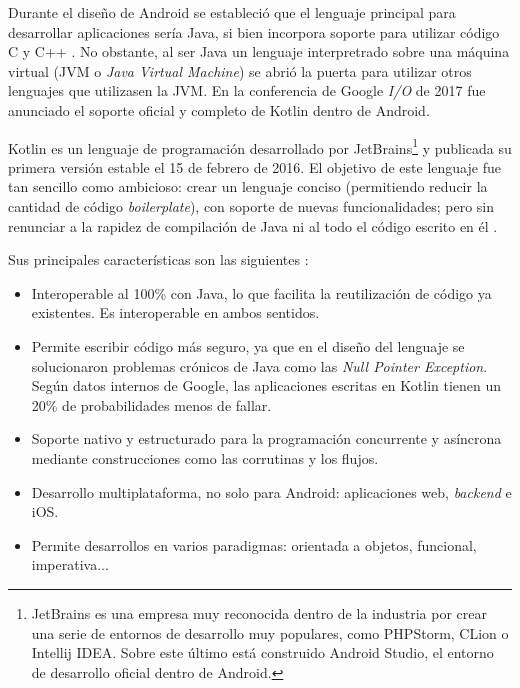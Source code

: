             Durante el diseño de Android se estableció que el lenguaje principal para desarrollar aplicaciones sería 
            Java, si bien incorpora soporte para utilizar código C y C++ \cite{android_developers_como_nodate}. No
            obstante, al ser Java un lenguaje interpretrado sobre una máquina virtual (JVM o \textit{Java Virtual
            Machine}) se abrió la puerta para  utilizar otros lenguajes que utilizasen la JVM. En la conferencia de 
            Google \textit{I/O} de 2017 fue anunciado el soporte oficial y completo 
            de Kotlin dentro de Android. 

            Kotlin es un lenguaje de programación desarrollado por JetBrains\footnote{JetBrains es una
            empresa muy reconocida dentro de la industria por crear una serie de entornos de desarrollo muy populares,
            como PHPStorm, CLion o Intellij IDEA. Sobre este último está construido Android Studio, el entorno de 
            desarrollo oficial dentro de Android.} y publicada su primera versión estable el 15 de febrero de 2016.
            El objetivo de este lenguaje fue tan sencillo como ambicioso: crear un lenguaje conciso (permitiendo reducir
            la cantidad de código \textit{boilerplate}), con soporte de nuevas funcionalidades; pero sin renunciar a la rapidez de
            compilación de Java ni al todo el código escrito en él 
            \cite{rao_k_history_nodate}. 

            Sus principales características son las siguientes \cite{noauthor_kotlin_nodate} \cite{noauthor_enfoque_nodate}:
            \begin{itemize}
                \item Interoperable al 100\% con Java, lo que facilita la reutilización de código ya existentes. 
                Es interoperable en ambos sentidos.
                \item Permite escribir código más seguro, ya que en el diseño del lenguaje se solucionaron problemas
                crónicos de Java como las \textit{Null Pointer Exception}. Según datos internos de Google, las 
                aplicaciones escritas en Kotlin tienen un 20\% de probabilidades menos de fallar.
                \item Soporte nativo y estructurado para la programación concurrente y asíncrona mediante 
                construcciones como las corrutinas y los flujos.
                \item Desarrollo multiplataforma, no solo para Android: aplicaciones web, \textit{backend} e iOS.
                \item Permite desarrollos en varios paradigmas: orientada a objetos, funcional, imperativa...
            \end{itemize}
            
